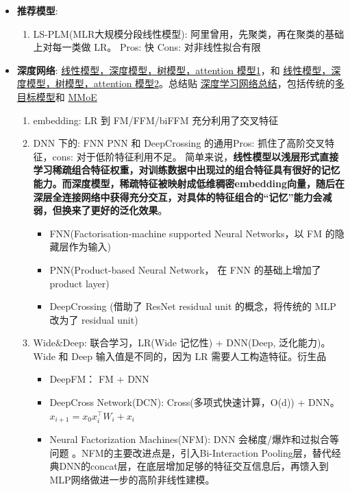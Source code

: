 \documentclass[12pt]{article}
\numberwithin{theorem}{section} %
\numberwithin{definition}{section} %
\numberwithin{assumption}{section} %
\numberwithin{lemma}{section} %
\numberwithin{remark}{section} %
\numberwithin{prop}{section} %
\numberwithin{corollary}{section} %
\numberwithin{example}{section} %
\numberwithin{question}{section} %
\numberwithin{problem}{section} %
\numberwithin{conjecture}{section} %
\numberwithin{append}{section} %
\numberwithin{property}{section} %
\begin{document}
\begin{CJK}{UTF8}{gbsn}
\begin{itemize}
	\item \textbf{推荐模型}:
	\begin{enumerate}
		\item LS-PLM(MLR大规模分段线性模型): 阿里曾用，先聚类，再在聚类的基础上对每一类做 LR。 Pros: 快 Cons: 对非线性拟合有限
	\end{enumerate}
	
	\item \textbf{深度网络}: \href{https://cloud.tencent.com/developer/article/1824345}{线性模型，深度模型，树模型，attention 模型1}，和 \href{https://cloud.tencent.com/developer/article/1824350?from=article.detail.1824345}{线性模型，深度模型，树模型，attention 模型2}。总结贴 \href{https://zhuanlan.zhihu.com/p/409610336}{深度学习网络总结}，包括传统的\href{https://www.youtube.com/watch?v=kY4W46MQqsg&list=PLvOO0btloRntAi-VnV06M1Bu0X1xljUUP&index=13}{多目标模型}和 \href{https://www.youtube.com/watch?v=JIEwaPARjfk&list=PLvOO0btloRntAi-VnV06M1Bu0X1xljUUP&index=14}{MMoE}
	\begin{enumerate}
		\item embedding: LR 到 FM/FFM/biFFM 充分利用了交叉特征
		\item DNN 下的: FNN PNN 和 DeepCrossing 的通用Pros: 抓住了高阶交叉特征，cons: 对于低阶特征利用不足。 简单来说，\textbf{线性模型以浅层形式直接学习稀疏组合特征权重，对训练数据中出现过的组合特征具有很好的记忆能力。而深度模型，稀疏特征被映射成低维稠密embedding向量，随后在深层全连接网络中获得充分交互，对具体的特征组合的“记忆”能力会减弱，但换来了更好的泛化效果}。
		\begin{itemize}
			\item FNN(Factorisation-machine supported Neural Networks，以 FM 的隐藏层作为输入)
			\item PNN(Product-based Neural Network， 在 FNN 的基础上增加了 product layer)
			\item DeepCrossing (借助了 ResNet residual unit 的概念，将传统的 MLP 改为了 residual unit)
		\end{itemize}
		\item Wide$\&$Deep: 联合学习，LR(Wide 记忆性) + DNN(Deep, 泛化能力)。Wide 和 Deep 输入值是不同的，因为 LR 需要人工构造特征。衍生品
		\begin{itemize}
			\item DeepFM： FM + DNN
			\item DeepCross Network(DCN): Cross(多项式快速计算，O(d)) + DNN。 $x_{i+1} = x_0x_i^\intercal W_i  + x_i$
			\item Neural Factorization Machines(NFM): DNN 会梯度/爆炸和过拟合等问题 。NFM的主要改进点是，引入Bi-Interaction Pooling层，替代经典DNN的concat层，在底层增加足够的特征交互信息后，再馈入到MLP网络做进一步的高阶非线性建模。

\end{itemize}
\end{enumerate}
\end{itemize}
\end{CJK}
\end{document}
